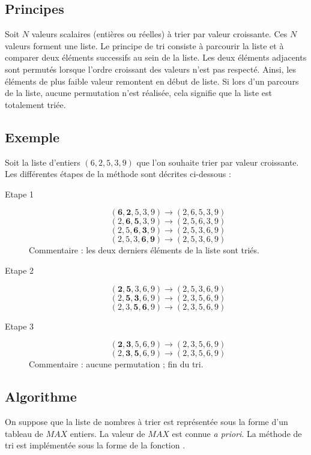 \subsection{Principes}

Soit $N$ valeurs scalaires (entières ou réelles) à trier par valeur croissante.
Ces $N$ valeurs forment une liste. Le principe de tri consiste à parcourir la
liste et à comparer deux éléments successifs au sein de la liste. Les deux
éléments adjacents sont permutés lorsque l'ordre croissant des valeurs n'est pas
respecté. Ainsi, les éléments de plus faible valeur remontent en début de liste.
Si lors d'un parcours de la liste, aucune permutation n'est réalisée, cela
signifie que la liste est totalement triée.

\subsection{Exemple}
 

Soit la liste d'entiers $(6, 2, 5, 3, 9)$ que l'on souhaite trier par valeur
croissante. Les différentes étapes de la méthode sont décrites ci-dessous :

\begin{description}
\item[Etape 1]
$$(\mathbf{6}, \mathbf{2}, 5, 3, 9) \to (2, 6, 5, 3, 9)$$
$$(2, \mathbf{6}, \mathbf{5}, 3, 9) \to (2, 5, 6, 3, 9)$$
$$(2, 5, \mathbf{6}, \mathbf{3}, 9) \to (2, 5, 3, 6, 9)$$
$$(2, 5, 3, \mathbf{6}, \mathbf{9}) \to (2, 5, 3, 6, 9)$$
Commentaire : les deux derniers éléments de la liste sont triés.
\item[Etape 2]
$$(\mathbf{2}, \mathbf{5}, 3, 6, 9) \to (2, 5, 3, 6, 9)$$
$$(2, \mathbf{5}, \mathbf{3}, 6, 9) \to (2, 3, 5, 6, 9)$$
$$(2, 3, \mathbf{5}, \mathbf{6}, 9) \to (2, 3, 5, 6, 9)$$
\item[Etape 3]
$$(\mathbf{2}, \mathbf{3}, 5, 6, 9) \to (2, 3, 5, 6, 9)$$
$$(2, \mathbf{3}, \mathbf{5}, 6, 9) \to (2, 3, 5, 6, 9)$$
Commentaire : aucune permutation ; fin du tri.
\end{description}

\subsection{Algorithme}

On suppose que la liste de nombres à trier est représentée sous la forme d'un
tableau de $MAX$ entiers. La valeur de $MAX$ est connue \textit{a priori}. La
méthode de tri est implémentée sous la forme de la fonction
.
 

